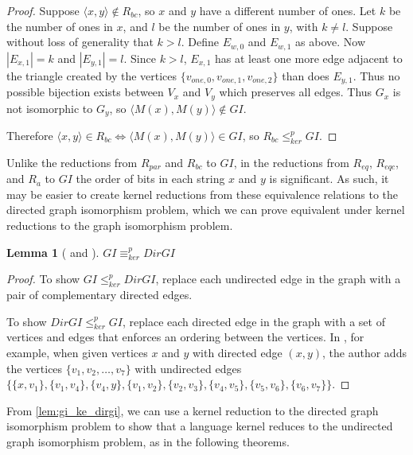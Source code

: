 \documentclass{article}
\newtheorem{lemma}[lemma]{Lemma}
\theoremstyle{definition} \newtheorem{definition}[definition]{Definition}
\newcommand{\kr}{\leq^{p}_{ker}} %
\newcommand{\kequiv}{\equiv^{p}_{ker}} %
\newcommand{\pair}[2]{\langle#1,#2\rangle} %
\begin{document}
\begin{proof}
  Suppose $\pair{x}{y}\notin R_{bc}$, so $x$ and $y$ have a different number of
  ones. Let $k$ be the number of ones in $x$, and $l$ be the number of ones in
  $y$, with $k\neq l$. Suppose without loss of generality that $k>l$. Define
  $E_{w,0}$ and $E_{w,1}$ as above. Now $|E_{x,1}|=k$ and $|E_{y,1}|=l$. Since
  $k>l$, $E_{x,1}$ has at least one more edge adjacent to the triangle created
  by the vertices $\{v_{one,0},v_{one,1},v_{one,2}\}$ than does $E_{y,1}$. Thus
  no possible bijection exists between $V_x$ and $V_y$ which preserves all
  edges. Thus $G_x$ is not isomorphic to $G_y$, so $\pair{M(x)}{M(y)}\notin
  GI$.

  Therefore $\pair{x}{y}\in R_{bc} \iff \pair{M(x)}{M(y)}\in GI$, so $R_{bc}\kr
  GI$.
\end{proof}

Unlike the reductions from $R_{par}$ and $R_{bc}$ to $GI$, in the reductions
from $R_{eq}$, $R_{eqc}$, and $R_a$ to $GI$ the order of bits in each string
$x$ and $y$ is significant. As such, it may be easier to create kernel
reductions from these equivalence relations to the directed graph isomorphism
problem, which we can prove equivalent under kernel reductions to the graph
isomorphism problem. 

\begin{lemma}[\cite{kst93} and \cite{miller77}]\label{lem:gi_ke_dirgi}
  $GI\kequiv DirGI$
\end{lemma}
\begin{proof}
  To show $GI\kr DirGI$, replace each undirected edge in the graph with a pair
  of complementary directed edges.
  
  To show $DirGI\kr GI$, replace each directed edge in the graph with a set of
  vertices and edges that enforces an ordering between the vertices. In
  \cite{miller77}, for example, when given vertices $x$ and $y$ with directed
  edge $(x,y)$, the author adds the vertices $\{v_1, v_2, \ldots, v_7\}$ with
  undirected edges $\{\{x, v_1\}, \{v_1,v_4\}, \{v_4,y\}, \{v_1,v_2\},
  \{v_2,v_3\}, \{v_4,v_5\}, \{v_5,v_6\}, \{v_6,v_7\}\}$.
\end{proof}

From \autoref{lem:gi_ke_dirgi}, we can use a kernel reduction to the directed
graph isomorphism problem to show that a language kernel reduces to the
undirected graph isomorphism problem, as in the following theorems.
\end{document}
